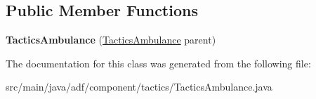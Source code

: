 \subsection*{Public Member Functions}
\begin{DoxyCompactItemize}
\item 
\hypertarget{classadf_1_1component_1_1tactics_1_1TacticsAmbulance_a8fd24c74ddb0d41ef1ad2d133312d0e4}{}\label{classadf_1_1component_1_1tactics_1_1TacticsAmbulance_a8fd24c74ddb0d41ef1ad2d133312d0e4} 
{\bfseries Tactics\+Ambulance} (\hyperlink{classadf_1_1component_1_1tactics_1_1TacticsAmbulance}{Tactics\+Ambulance} parent)
\end{DoxyCompactItemize}


The documentation for this class was generated from the following file\+:\begin{DoxyCompactItemize}
\item 
src/main/java/adf/component/tactics/Tactics\+Ambulance.\+java\end{DoxyCompactItemize}
